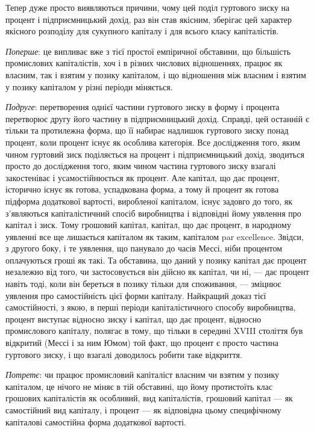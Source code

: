 
Тепер дуже просто виявляються причини, чому цей поділ
гуртового зиску на процент і підприємницький дохід, раз він
став якісним, зберігає цей характер якісного розподілу для сукупного
капіталу і для всього класу капіталістів.

\emph{Поперше}: це випливає вже з тієї простої емпіричної обставини,
що більшість промислових капіталістів, хоч і в різних числових
відношеннях, працює як власним, так і взятим у позику
капіталом, і що відношення між власним і взятим у позику капіталом
у різні періоди міняється.

\emph{Подруге}: перетворення однієї частини гуртового зиску в форму і
процента перетворює другу його частину в підприємницький
дохід. Справді, цей останній є тільки та протилежна форма, що
її набирає надлишок гуртового зиску понад процент, коли процент
існує як особлива категорія. Все дослідження того, яким
чином гуртовий зиск поділяється на процент і підприємницький
дохід, зводиться просто до дослідження того, яким чином частина
гуртового зиску взагалі закостеніває і усамостійнюється
як процент. Але капітал, що дає процент, історично існує як
готова, успадкована форма, а тому й процент як готова підформа
додаткової вартості, виробленої капіталом, існує задовго
до того, як з’являються капіталістичний спосіб виробництва і
відповідні йому уявлення про капітал і зиск. Тому грошовий капітал,
капітал, що дає процент, в народному уявленні все ще лишається
капіталом як таким, капіталом par excellence. Звідси, з
другого боку, і те уявлення, що панувало до часів Мессі, ніби процентом
оплачуються гроші як такі. Та обставина, що даний у
позику капітал дає процент незалежно від того, чи застосовується
він дійсно як капітал, чи ні, — дає процент навіть тоді, коли він береться
в позику тільки для споживання, — зміцнює уявлення про
самостійність цієї форми капіталу. Найкращий доказ тієї самостійності,
з якою, в перші періоди капіталістичного способу
виробництва, процент виступає відносно зиску і капітал, що дає
процент, відносно промислового капіталу, полягає в тому, що
тільки в середині XVIII століття був відкритий (Мессі і за ним
Юмом) той факт, що процент є просто частина гуртового зиску,
і що взагалі доводилось робити таке відкриття.

\emph{Потретє}: чи працює промисловий капіталіст власним чи
взятим у позику капіталом, це нічого не міняє в тій обставині,
що йому протистоїть клас грошових капіталістів як особливий,
вид капіталістів, грошовий капітал — як самостійний вид капіталу,
і процент — як відповідна цьому специфічному капіталові самостійна
форма додаткової вартості.

